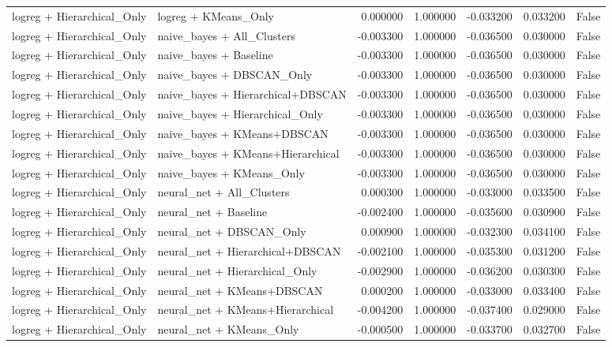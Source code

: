 \begin{tabular}{llrrrrr}
logreg + Hierarchical_Only & logreg + KMeans_Only & 0.000000 & 1.000000 & -0.033200 & 0.033200 & False \\
logreg + Hierarchical_Only & naive_bayes + All_Clusters & -0.003300 & 1.000000 & -0.036500 & 0.030000 & False \\
logreg + Hierarchical_Only & naive_bayes + Baseline & -0.003300 & 1.000000 & -0.036500 & 0.030000 & False \\
logreg + Hierarchical_Only & naive_bayes + DBSCAN_Only & -0.003300 & 1.000000 & -0.036500 & 0.030000 & False \\
logreg + Hierarchical_Only & naive_bayes + Hierarchical+DBSCAN & -0.003300 & 1.000000 & -0.036500 & 0.030000 & False \\
logreg + Hierarchical_Only & naive_bayes + Hierarchical_Only & -0.003300 & 1.000000 & -0.036500 & 0.030000 & False \\
logreg + Hierarchical_Only & naive_bayes + KMeans+DBSCAN & -0.003300 & 1.000000 & -0.036500 & 0.030000 & False \\
logreg + Hierarchical_Only & naive_bayes + KMeans+Hierarchical & -0.003300 & 1.000000 & -0.036500 & 0.030000 & False \\
logreg + Hierarchical_Only & naive_bayes + KMeans_Only & -0.003300 & 1.000000 & -0.036500 & 0.030000 & False \\
logreg + Hierarchical_Only & neural_net + All_Clusters & 0.000300 & 1.000000 & -0.033000 & 0.033500 & False \\
logreg + Hierarchical_Only & neural_net + Baseline & -0.002400 & 1.000000 & -0.035600 & 0.030900 & False \\
logreg + Hierarchical_Only & neural_net + DBSCAN_Only & 0.000900 & 1.000000 & -0.032300 & 0.034100 & False \\
logreg + Hierarchical_Only & neural_net + Hierarchical+DBSCAN & -0.002100 & 1.000000 & -0.035300 & 0.031200 & False \\
logreg + Hierarchical_Only & neural_net + Hierarchical_Only & -0.002900 & 1.000000 & -0.036200 & 0.030300 & False \\
logreg + Hierarchical_Only & neural_net + KMeans+DBSCAN & 0.000200 & 1.000000 & -0.033000 & 0.033400 & False \\
logreg + Hierarchical_Only & neural_net + KMeans+Hierarchical & -0.004200 & 1.000000 & -0.037400 & 0.029000 & False \\
logreg + Hierarchical_Only & neural_net + KMeans_Only & -0.000500 & 1.000000 & -0.033700 & 0.032700 & False \\

\end{tabular}
